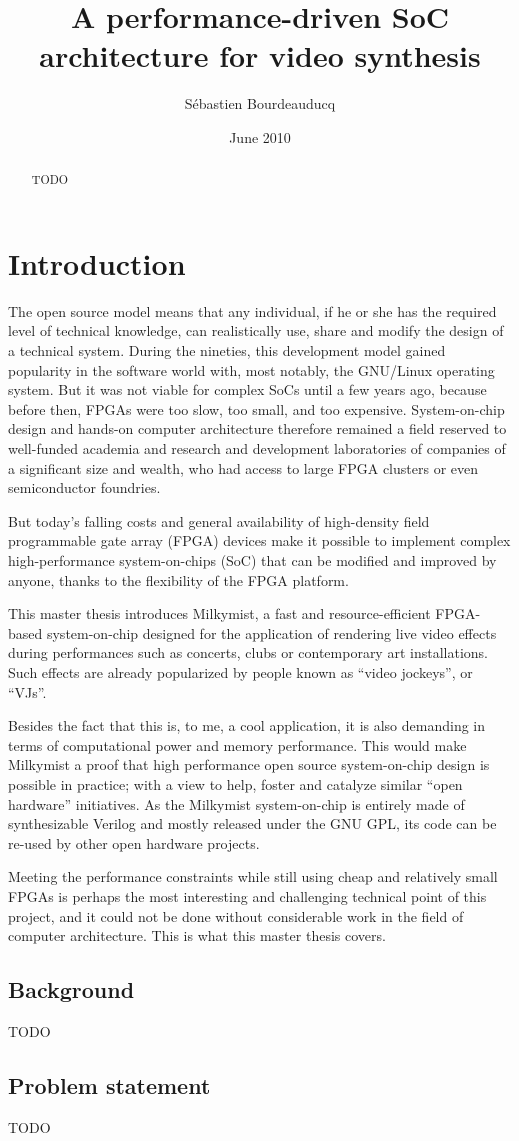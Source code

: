 \documentclass[a4paper,11pt]{kthesis}
\title{A performance-driven SoC architecture for video synthesis}
\date{June 2010}
\author{S\'ebastien Bourdeauducq}
\begin{document}
\begin{abstract}
TODO
\end{abstract}

\tableofcontents
\listoffigures

\mainmatter 

\chapter{Introduction}
The open source model means that any individual, if he or she has the required level of technical knowledge, can realistically use, share and modify the design of a technical system. During the nineties, this development model gained popularity in the software world with, most notably, the GNU/Linux operating system. But it was not viable for complex SoCs until a few years ago, because before then, FPGAs were too slow, too small, and too expensive. System-on-chip design and hands-on computer architecture therefore remained a field reserved to well-funded academia and research and development laboratories of companies of a significant size and wealth, who had access to large FPGA clusters or even semiconductor foundries.

But today's falling costs and general availability of high-density field programmable gate array (FPGA) devices make it possible to implement complex high-performance system-on-chips (SoC) that can be modified and improved by anyone, thanks to the flexibility of the FPGA platform.

This master thesis introduces Milkymist\cite{milkymist}, a fast and resource-efficient FPGA-based system-on-chip designed for the application of rendering live video effects during performances such as concerts, clubs or contemporary art installations. Such effects are already popularized by people known as ``video jockeys'', or ``VJs''.

Besides the fact that this is, to me, a cool application, it is also demanding in terms of computational power and memory performance. This would make Milkymist a proof that high performance open source system-on-chip design is possible in practice; with a view to help, foster and catalyze similar ``open hardware'' initiatives. As the Milkymist system-on-chip is entirely made of synthesizable Verilog and mostly released under the GNU GPL, its code can be re-used by other open hardware projects.

Meeting the performance constraints while still using cheap and relatively small FPGAs is perhaps the most interesting and challenging technical point of this project, and it could not be done without considerable work in the field of computer architecture. This is what this master thesis covers.

\section{Background}
TODO

\section{Problem statement}
TODO

{}

\end{document}
